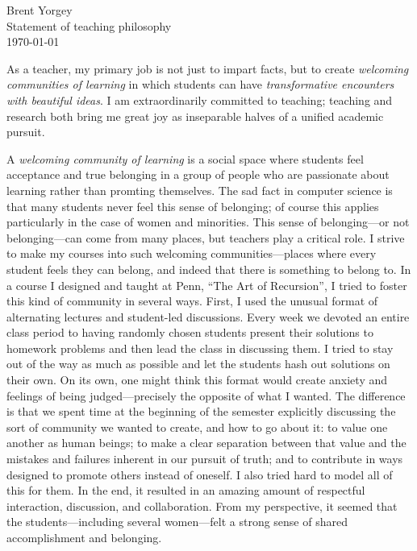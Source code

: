 \documentclass[12pt]{article}
\begin{document}
\noindent Brent Yorgey \\
Statement of teaching philosophy \\
\today
\bigskip

As a teacher, my primary job is not just to impart facts, but to create
\emph{welcoming communities of learning} in which students can have
\emph{transformative encounters with beautiful ideas}.  I am
extraordinarily committed to teaching; teaching and research both
bring me great joy as inseparable halves of a unified academic
pursuit.

A \emph{welcoming community of learning} is a social space where
students feel acceptance and true belonging in a group of people who
are passionate about learning rather than promting themselves.  The
sad fact in computer science is that many students never feel this
sense of belonging; of course this applies particularly in the case of
women and minorities. This sense of belonging---or not belonging---can
come from many places, but teachers play a critical role.  I strive to
make my courses into such welcoming communities---places where every
student feels they can belong, and indeed that there is something to
belong to.  In a course I designed and taught at Penn, ``The Art of
Recursion'', I tried to foster this kind of community in several ways.
First, I used the unusual format of alternating lectures and
student-led discussions. Every week we devoted an entire class period
to having randomly chosen students present their solutions to homework
problems and then lead the class in discussing them.  I tried to stay
out of the way as much as possible and let the students hash out
solutions on their own.  On its own, one might think this format would
create anxiety and feelings of being judged---precisely the opposite
of what I wanted.  The difference is that we spent time at the
beginning of the semester explicitly discussing the sort of community
we wanted to create, and how to go about it: to value one another as
human beings; to make a clear separation between that value and the
mistakes and failures inherent in our pursuit of truth; and to
contribute in ways designed to promote others instead of oneself. I
also tried hard to model all of this for them. In the end, it resulted
in an amazing amount of respectful interaction, discussion, and
collaboration. From my perspective, it seemed that the
students---including several women---felt a strong sense of shared
accomplishment and belonging.

\end{document}
